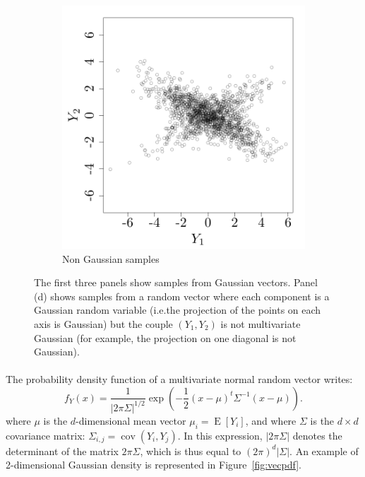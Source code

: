\documentclass[twoside,openright]{report}
\DeclareMathOperator*{\E}{E}
\DeclareMathOperator*{\Cov}{cov}
\begin{document}
\begin{figure}[ht!]
\begin{subfigure}[b]{0.34\textwidth}
                \includegraphics[width=\textwidth]{figures/ch1_gaussvec4}
                \caption{Non Gaussian samples}
        \end{subfigure}%
        \caption{The first three panels show samples from Gaussian vectors. Panel (d) shows samples from a random vector where each component is a Gaussian random variable (i.e.\@ the projection of the points on each axis is Gaussian) but the couple $(Y_1,Y_2)$ is not multivariate Gaussian (for example, the projection on one diagonal is not Gaussian).}
        \label{fig:vecsample}
\end{figure}

\paragraph{}
The probability density function of a multivariate normal random vector writes:
\begin{equation}
f_Y(x) = \frac{1}{\displaystyle | 2 \pi \Sigma|^{1/2}} \exp \left(-\frac12 (x-\mu)^t \Sigma^{-1} (x-\mu)  \right).
\label{eq:pdf}
\end{equation}  
where $\mu$ is the $d$-dimensional mean vector $\mu_i = \E[Y_i]$, and where $\Sigma$ is the $d \times d$ covariance matrix: $\Sigma_{i,j}=\Cov(Y_i, Y_j)$. In this expression, $| 2 \pi \Sigma|$ denotes the determinant of the matrix $2 \pi \Sigma$, which is thus equal to $(2 \pi)^d|  \Sigma|$. An example of 2-dimensional Gaussian density is represented in Figure~\ref{fig:vecpdf}.
\end{document}
